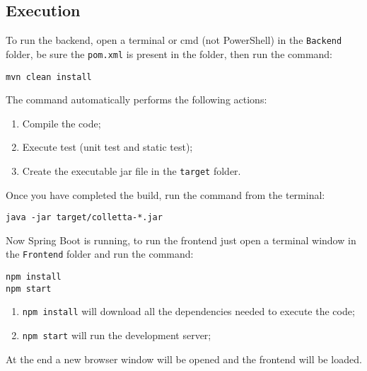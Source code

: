 \subsection{Execution}
To run the backend, open a terminal or cmd (not PowerShell) in the \texttt{Backend} folder, be sure the \texttt{pom.xml} is present in the folder, then run the command: 
\begin{center}
\texttt{mvn clean install}
\end{center} 
The command automatically performs the following actions:
\begin{enumerate}
\item Compile the code;
\item Execute test (unit test and static test);
\item Create the executable jar file in the \texttt{target} folder.
\end{enumerate}
Once you have completed the build, run the command from the terminal:\\
\begin{center}
\texttt{java -jar target/colletta-*.jar}
\end{center}
Now Spring Boot is running, to run the frontend just open a terminal window in the \texttt{Frontend} folder and run the command: 
\begin{center}
\texttt{npm install}
\\
\texttt{npm start}
\end{center}
\begin{enumerate}
\item \texttt{npm install} will download all the dependencies needed to execute the code;
\item \texttt{npm start} will run the development server; 
\end{enumerate}
At the end a new browser window will be opened and the frontend will be loaded.

